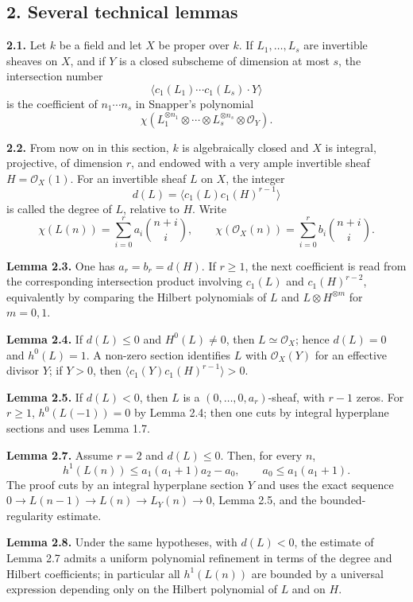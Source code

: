 \documentclass[11pt]{article}
\begin{document}
\subsection*{2. Several technical lemmas}
\textbf{2.1.} Let $k$ be a field and let $X$ be proper over $k$. If $L_1,\ldots,L_s$ are invertible sheaves on $X$, and if $Y$ is a closed subscheme of dimension at most $s$, the intersection number
\[
 \langle c_1(L_1)\cdots c_1(L_s)\cdot Y\rangle
\]
is the coefficient of $n_1\cdots n_s$ in Snapper's polynomial
\[
 \chi(L_1^{\otimes n_1}\otimes\cdots\otimes L_s^{\otimes n_s}\otimes\mathcal O_Y).
\]

\textbf{2.2.} From now on in this section, $k$ is algebraically closed and $X$ is integral, projective, of dimension $r$, and endowed with a very ample invertible sheaf $H=\mathcal O_X(1)$. For an invertible sheaf $L$ on $X$, the integer
\[
 d(L)=\langle c_1(L)c_1(H)^{r-1}\rangle
\]
is called the degree of $L$, relative to $H$. Write
\[
 \chi(L(n))=\sum_{i=0}^r a_i\binom{n+i}{i},\qquad
 \chi(\mathcal O_X(n))=\sum_{i=0}^r b_i\binom{n+i}{i}.
\]

\textbf{Lemma 2.3.} One has $a_r=b_r=d(H)$. If $r\ge1$, the next coefficient is read from the corresponding intersection product involving $c_1(L)$ and $c_1(H)^{r-2}$, equivalently by comparing the Hilbert polynomials of $L$ and $L\otimes H^{\otimes m}$ for $m=0,1$.

\textbf{Lemma 2.4.} If $d(L)\le0$ and $H^0(L)\ne0$, then $L\simeq\mathcal O_X$; hence $d(L)=0$ and $h^0(L)=1$. A non-zero section identifies $L$ with $\mathcal O_X(Y)$ for an effective divisor $Y$; if $Y>0$, then $\langle c_1(Y)c_1(H)^{r-1}\rangle>0$.

\textbf{Lemma 2.5.} If $d(L)<0$, then $L$ is a $(0,\ldots,0,a_r)$-sheaf, with $r-1$ zeros. For $r\ge1$, $h^0(L(-1))=0$ by Lemma 2.4; then one cuts by integral hyperplane sections and uses Lemma 1.7.

\textbf{Lemma 2.7.} Assume $r=2$ and $d(L)\le0$. Then, for every $n$,
\[
 h^1(L(n))\le a_1(a_1+1)a_2-a_0,
\qquad
 a_0\le a_1(a_1+1).
\]
The proof cuts by an integral hyperplane section $Y$ and uses the exact sequence $0\to L(n-1)\to L(n)\to L_Y(n)\to0$, Lemma 2.5, and the bounded-regularity estimate.

\textbf{Lemma 2.8.} Under the same hypotheses, with $d(L)<0$, the estimate of Lemma 2.7 admits a uniform polynomial refinement in terms of the degree and Hilbert coefficients; in particular all $h^1(L(n))$ are bounded by a universal expression depending only on the Hilbert polynomial of $L$ and on $H$.
\end{document}
